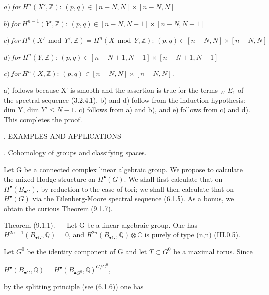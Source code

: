 \documentclass[11pt,twoside]{article}
\newcommand{\DFormula}[1]{%
  \par\smallskip\noindent\hspace*{0pt}\(\displaystyle #1\)\par\smallskip
}
\begin{document}
\DFormula{a)\,for\,H^{n}(X′,\mathbb{Z}):\,(p,q)\in [n−N,N]\times [n−N,N]}
\par\medskip
\DFormula{b)\,for\,H^{n−1}(Y′,\mathbb{Z}):\,(p,q)\in [n−N,N−1]\times [n−N,N−1]}
\par\medskip
\DFormula{c)\,for\,H^{n}(X′\,\operatorname{mod}\,Y′,\mathbb{Z})=H^{n}(X\,\operatorname{mod}\,Y,\mathbb{Z}):\,(p,q)\in [n−N,N]\times [n−N,N]}
\par\medskip
\DFormula{d)\,for\,H^{n}(Y,\mathbb{Z}):\,(p,q)\in [n−N+1,N−1]\times [n−N+1,N−1]}
\par\medskip
\DFormula{e)\,for\,H^{n}(X,\mathbb{Z}):\,(p,q)\in [n−N,N]\times [n−N,N].}
\par\medskip
a) follows because X′ is smooth and the assertion is true for the terms \(_{W}\) \(E_{1}\) of the spectral sequence (3.2.4.1). b) and d) follow from the induction hypothesis: dim Y, dim \(Y′\leq N−1\). c) follows from a) and b), and e) follows from c) and d). This completes the proof.\par
\par{}. EXAMPLES AND APPLICATIONS\par
\par{}. Cohomology of groups and classifying spaces.\par
\par\medskip
Let G be a connected complex linear algebraic group. We propose to calculate the mixed Hodge structure on \(H^{\bullet }(G)\). We shall first calculate that on \(H^{\bullet }(B_{\bullet G})\), by reduction to the case of tori; we shall then calculate that on \(H^{\bullet }(G)\) via the Eilenberg-Moore spectral sequence (6.1.5). As a bonus, we obtain the curious Theorem (9.1.7).\par
\par\medskip
Theorem (9.1.1). — Let G be a linear algebraic group. One has \(H^{2n+1}(B_{\bullet G},\mathbb{Q})=0\), and \(H^{2n}(B_{\bullet G},\mathbb{Q})\otimes \mathbb{C}\) is purely of type (n,n) (III.0.5).\par
\par\medskip
Let \(G^{0}\) be the identity component of G and let \(T\subset G^{0}\) be a maximal torus. Since\par
\par\medskip
\DFormula{H^{\bullet }(B_{\bullet G},\mathbb{Q})=H^{\bullet }(B_{\bullet G^{0}},\mathbb{Q})^{G/G^{0}},}
\par\medskip
by the splitting principle (see (6.1.6)) one has\par
\par\medskip
\end{document}
